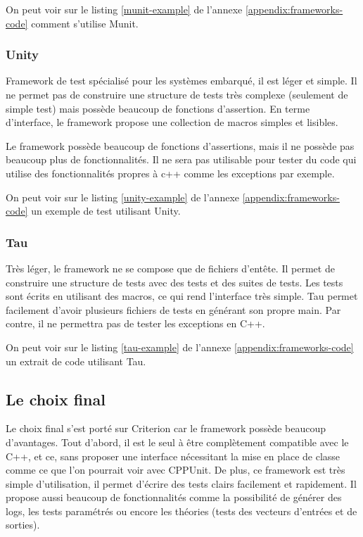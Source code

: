\documentclass[a4paper]{article}
\begin{document}
On peut voir sur le listing \ref{munit-example} de l'annexe
\ref{appendix:frameworks-code} comment s'utilise Munit.

\subsubsection*{Unity}

Framework de test spécialisé pour les systèmes embarqué, il est léger et simple.
Il ne permet pas de construire une structure de tests très complexe (seulement
de simple test) mais possède beaucoup de fonctions d'assertion. En terme
d'interface, le framework propose une collection de macros simples et lisibles.

Le framework possède beaucoup de fonctions d'assertions, mais il ne possède pas
beaucoup plus de fonctionnalités. Il ne sera pas utilisable pour tester du code
qui utilise des fonctionnalités propres à c++ comme les exceptions par exemple.

On peut voir sur le listing \ref{unity-example} de l'annexe
\ref{appendix:frameworks-code} un exemple de test utilisant Unity.

\subsubsection*{Tau}

Très léger, le framework ne se compose que de fichiers d'entête. Il permet de
construire une structure de tests avec des tests et des suites de tests. Les
tests sont écrits en utilisant des macros, ce qui rend l'interface très simple.
Tau permet facilement d'avoir plusieurs fichiers de tests en générant son propre
main. Par contre, il ne permettra pas de tester les exceptions en C++.

On peut voir sur le listing \ref{tau-example} de l'annexe
\ref{appendix:frameworks-code} un extrait de code utilisant Tau.
\subsection{Le choix final}%

Le choix final s'est porté sur Criterion car le framework possède beaucoup
d'avantages. Tout d'abord, il est le seul à être complètement compatible avec le
C++, et ce, sans proposer une interface nécessitant la mise en place de classe
comme ce que l'on pourrait voir avec CPPUnit. De plus, ce framework est très
simple d'utilisation, il permet d'écrire des tests clairs facilement et
rapidement. Il propose aussi beaucoup de fonctionnalités comme la possibilité de
générer des logs, les tests paramétrés ou encore les théories (tests des
vecteurs d'entrées et de sorties).
\end{document}
